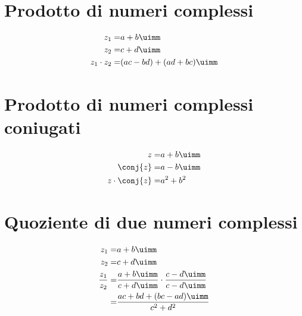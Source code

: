 \section{Prodotto di numeri complessi}
\begin{align}
z_1=&a+b\uimm\\
z_2=&c+d\uimm\\
z_1\cdot z_2=&(ac-bd)+(ad+bc)\uimm
\end{align}
\section{Prodotto di numeri complessi coniugati}
\begin{align}
z=&a+b\uimm\\
\conj{z}=&a-b\uimm\\
z\cdot\conj{z}=&a^2+b^2
\end{align}
\section{Quoziente di due numeri complessi}
\begin{align}
z_1=&a+b\uimm\\
z_2=&c+d\uimm\\
\dfrac{z_1}{z_2}=&\dfrac{a+b\uimm}{c+d\uimm}\cdot\dfrac{c-d\uimm}{c-d\uimm}\\
=&\dfrac{ac+bd+(bc-ad)\uimm}{c^2+d^2}
\end{align}

